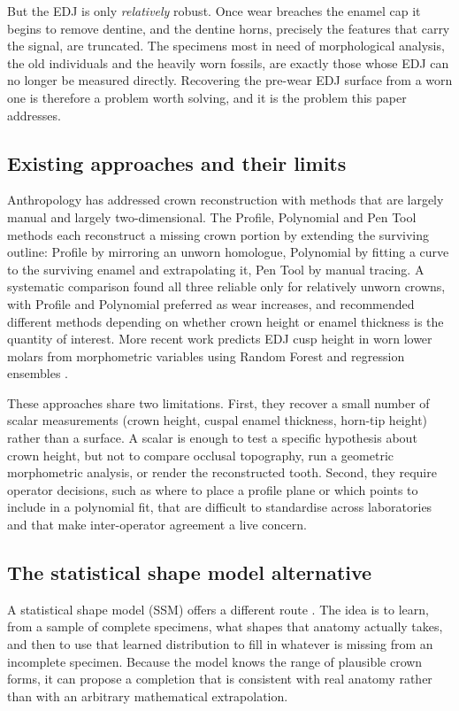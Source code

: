 \documentclass[10pt,a4paper,twocolumn]{article}
\begin{document}
But the EDJ is only \emph{relatively} robust. Once wear breaches the enamel cap
it begins to remove dentine, and the dentine horns, precisely the features
that carry the signal, are truncated. The specimens most in need of
morphological analysis, the old individuals and the heavily worn fossils, are
exactly those whose EDJ can no longer be measured directly. Recovering the
pre-wear EDJ surface from a worn one is therefore a problem worth solving, and
it is the problem this paper addresses.

\subsection{Existing approaches and their limits}

Anthropology has addressed crown reconstruction with methods that are largely
manual and largely two-dimensional. The Profile, Polynomial and Pen Tool methods
each reconstruct a missing crown portion by extending the surviving outline:
Profile by mirroring an unworn homologue, Polynomial by fitting a curve to the
surviving enamel and extrapolating it, Pen Tool by manual tracing. A systematic
comparison \citep{ohara2022reconstructing} found all three reliable only for
relatively unworn crowns, with Profile and Polynomial preferred as wear
increases, and recommended different methods depending on whether crown height
or enamel thickness is the quantity of interest. More recent work predicts EDJ
cusp height in worn lower molars from morphometric variables using Random Forest
and regression ensembles \citep{cuspml2026}.

These approaches share two limitations. First, they recover a small number of
scalar measurements (crown height, cuspal enamel thickness, horn-tip height)
rather than a surface. A scalar is enough to test a specific hypothesis about
crown height, but not to compare occlusal topography, run a geometric
morphometric analysis, or render the reconstructed tooth. Second, they require
operator decisions, such as where to place a profile plane or which points to
include in a polynomial fit, that are difficult to standardise across laboratories and
that make inter-operator agreement a live concern.

\subsection{The statistical shape model alternative}

A statistical shape model (SSM) offers a different route \citep{cootes1995asm}.
The idea is to learn, from a sample of complete specimens, what shapes that
anatomy actually takes, and then to use that learned distribution to fill in
whatever is missing from an incomplete specimen. Because the model knows the
range of plausible crown forms, it can propose a completion that is consistent
with real anatomy rather than with an arbitrary mathematical extrapolation.
\end{document}
